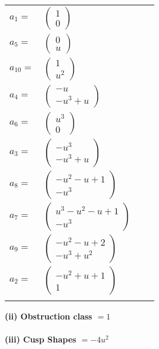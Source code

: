 \documentclass[1p]{elsarticle_modified}
\theoremstyle{definition}
\begin{document}
\begin{tabular}{m{7pt} m{180pt} m{7pt} m{180pt} }
\flushright $a_{1}=$&$\begin{pmatrix}1\\0\end{pmatrix}$ \\
\flushright $a_{5}=$&$\begin{pmatrix}0\\u\end{pmatrix}$ \\
\flushright $a_{10}=$&$\begin{pmatrix}1\\u^2\end{pmatrix}$ \\
\flushright $a_{4}=$&$\begin{pmatrix}- u\\- u^3+u\end{pmatrix}$ \\
\flushright $a_{6}=$&$\begin{pmatrix}u^3\\0\end{pmatrix}$ \\
\flushright $a_{3}=$&$\begin{pmatrix}- u^3\\- u^3+u\end{pmatrix}$ \\
\flushright $a_{8}=$&$\begin{pmatrix}- u^2- u+1\\- u^3\end{pmatrix}$ \\
\flushright $a_{7}=$&$\begin{pmatrix}u^3- u^2- u+1\\- u^3\end{pmatrix}$ \\
\flushright $a_{9}=$&$\begin{pmatrix}- u^2- u+2\\- u^3+u^2\end{pmatrix}$ \\
\flushright $a_{2}=$&$\begin{pmatrix}- u^2+u+1\\1\end{pmatrix}$\\&\end{tabular}
\flushleft \textbf{(ii) Obstruction class $= 1$}\\~\\
\flushleft \textbf{(iii) Cusp Shapes $= -4 u^2$}\\~\\
\end{document}
